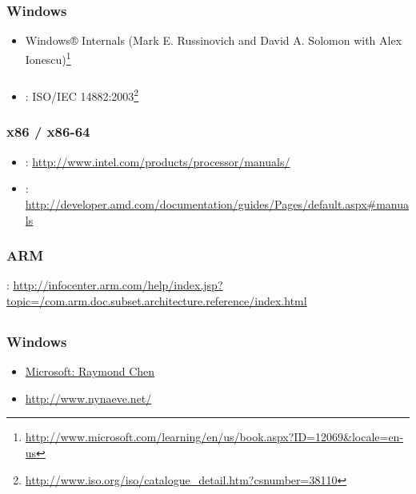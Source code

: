 ﻿\chapter{}

\section{}

\subsection{Windows}

\begin{itemize}
\item
Windows® Internals (Mark E. Russinovich and David A. Solomon with Alex Ionescu)\footnote{\url{http://www.microsoft.com/learning/en/us/book.aspx?ID=12069&locale=en-us}}
\end{itemize}

\subsection{\CCpp}

\begin{itemize}
\item
{}: ISO/IEC 14882:2003\footnote{\url{http://www.iso.org/iso/catalogue_detail.htm?csnumber=38110}}
\end{itemize}

\subsection{x86 / x86-64}

\begin{itemize}
\item
{}: \url{http://www.intel.com/products/processor/manuals/}
\item
{}: \url{http://developer.amd.com/documentation/guides/Pages/default.aspx#manuals}
\end{itemize}

\subsection{ARM}

: \url{http://infocenter.arm.com/help/index.jsp?topic=/com.arm.doc.subset.architecture.reference/index.html}

\section{}

\subsection{Windows}

\begin{itemize}
\item
\href{http://blogs.msdn.com/oldnewthing/}{Microsoft: Raymond Chen}
\item
\url{http://www.nynaeve.net/}
\end{itemize}

